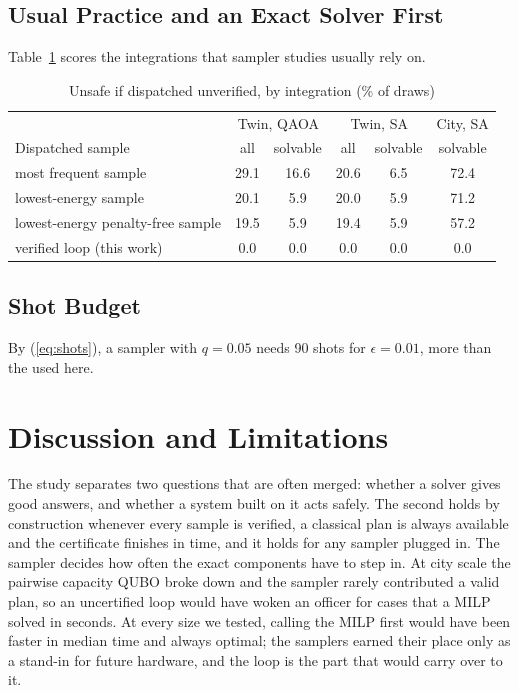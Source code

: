 \documentclass[conference]{IEEEtran}
\begin{document}
\subsection{Usual Practice and an Exact Solver First}
\label{sec:base}
Table~\ref{tab:base} scores the integrations that sampler studies usually rely on. \BaseText{}

\begin{table}[t]
\caption{Unsafe if dispatched unverified, by integration (\% of draws)}
\label{tab:base}
\centering
\footnotesize
\setlength{\tabcolsep}{2.2pt}
\begin{tabular}{lccccc}
\toprule
 & \multicolumn{2}{c}{Twin, QAOA} & \multicolumn{2}{c}{Twin, SA} & City, SA\\
Dispatched sample & all & solvable & all & solvable & solvable\\
\midrule
most frequent sample & 29.1 & 16.6 & 20.6 & 6.5 & 72.4\\
lowest-energy sample & 20.1 & 5.9 & 20.0 & 5.9 & 71.2\\
lowest-energy penalty-free sample & 19.5 & 5.9 & 19.4 & 5.9 & 57.2\\
verified loop (this work) & 0.0 & 0.0 & 0.0 & 0.0 & 0.0\\
\bottomrule
\end{tabular}
\end{table}

\ExactFirstText{} \StrongText{}

\subsection{Shot Budget}
\ShotText{} By (\ref{eq:shots}), a sampler with $q=0.05$ needs 90 shots for $\epsilon=0.01$, more than the \Shots{} used here.

\section{Discussion and Limitations}
The study separates two questions that are often merged: whether a solver gives good answers, and whether a system built on it acts safely. The second holds by construction whenever every sample is verified, a classical plan is always available and the certificate finishes in time, and it holds for any sampler plugged in. The sampler decides how often the exact components have to step in. At city scale the pairwise capacity QUBO broke down and the sampler rarely contributed a valid plan, so an uncertified loop would have woken an officer for cases that a MILP solved in seconds. At every size we tested, calling the MILP first would have been faster in median time and always optimal; the samplers earned their place only as a stand-in for future hardware, and the loop is the part that would carry over to it.
\end{document}

